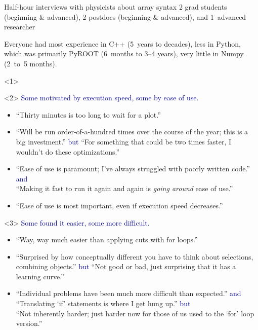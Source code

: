 \documentclass[aspectratio=169]{beamer}
\begin{document}
\begin{frame}{Half-hour interviews with physicists about array syntax}
\vspace{0.5 cm}
2 grad students (beginning \& advanced), 2 postdocs (beginning \& advanced), and 1~advanced researcher

\vspace{0.25 cm}
Everyone had most experience in C++ (5~years to decades), less in Python, which was primarily PyROOT (6~months to 3--4 years), very little in Numpy (2~to~5 months).

\vspace{0.5 cm}

\begin{onlyenv}<1>
\vspace{6 cm}
\end{onlyenv}

\begin{onlyenv}<2>
\textcolor{darkblue}{Some motivated by execution speed, some by ease of use.}
\small
\begin{itemize}
\item ``Thirty minutes is too long to wait for a plot.''
\item ``Will be run order-of-a-hundred times over the course of the year; this is a big investment.'' \textcolor{darkblue}{but} ``For something that could be two times faster, I wouldn't do these optimizations.''
\item ``Ease of use is paramount; I've always struggled with poorly written code.'' \textcolor{darkblue}{and} \\ ``Making it fast to run it again and again is {\it going around} ease of use.''
\item ``Ease of use is most important, even if execution speed decreases.''
\end{itemize}
\vspace{0.5 cm}
\end{onlyenv}

\begin{onlyenv}<3>
\textcolor{darkblue}{Some found it easier, some more difficult.}
\small
\begin{itemize}
\item ``Way, way much easier than applying cuts with for loops.''
\item ``Surprised by how conceptually different you have to think about selections, combining objects.'' \textcolor{darkblue}{but} ``Not good or bad, just surprising that it has a learning curve.''
\item ``Individual problems have been much more difficult than expected.'' \textcolor{darkblue}{and} \\ ``Translating `if' statements is where I get hung up.'' \textcolor{darkblue}{but} \\ ``Not inherently harder; just harder now for those of us used to the `for' loop version.''
\end{itemize}
\vspace{1 cm}
\end{onlyenv}


\end{frame}
\end{document}
